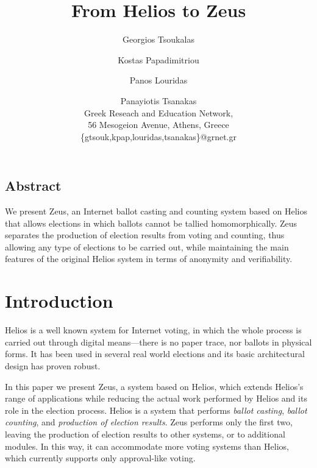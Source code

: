 \documentclass[letterpaper,twocolumn,10pt]{article}
\begin{document}
\date{}

\title{\Large \bf From Helios to Zeus}

\author{
{\rm Georgios Tsoukalas}\\
\and 
{\rm Kostas Papadimitriou}\\
\and 
{\rm Panos Louridas}\\
\and 
{\rm Panayiotis Tsanakas}\\
Greek Reseach and Education Network,\\
56 Mesogeion Avenue, Athens, Greece\\
\{gtsouk,kpap,louridas,tsanakas\}@grnet.gr
}

\maketitle

\thispagestyle{empty}

\subsection*{Abstract}

We present Zeus, an Internet ballot casting and counting system
based on Helios that allows elections in which ballots cannot be
tallied homomorphically. Zeus separates the production of election
results from voting and counting, thus allowing any type of
elections to be carried out, while maintaining the main features of
the original Helios system in terms of anonymity and verifiability.

\section{Introduction}

Helios is a well known system for Internet voting, in which the whole
process is carried out through digital means---there is no paper
trace, nor ballots in physical forms. It has been used in several real
world elections and its basic architectural design has proven robust.

In this paper we present Zeus, a system based on Helios, which extends
Helios's range of applications while reducing the actual work
performed by Helios and its role in the election process. Helios is a
system that performs \emph{ballot casting}, \emph{ballot counting},
and \emph{production of election results}. Zeus performs only the
first two, leaving the production of election results to other
systems, or to additional modules. In this way, it can accommodate
more voting systems than Helios, which currently supports only
approval-like voting.
\end{document}
